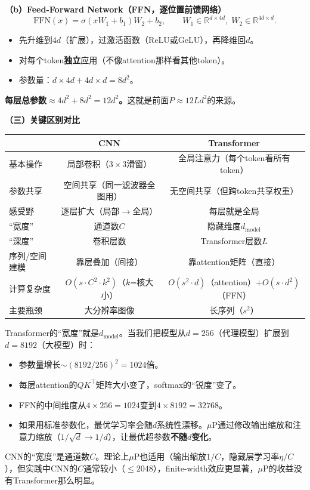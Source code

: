 \documentclass[11pt,a4paper]{article}
\newcommand{\R}{\mathbb{R}}
\begin{document}
\textbf{（b）Feed-Forward Network（FFN，逐位置前馈网络）}
\[
\text{FFN}(x) = \sigma(xW_1 + b_1)W_2 + b_2, \qquad W_1\in\R^{d\times 4d},\; W_2\in\R^{4d\times d}.
\]
\begin{itemize}[leftmargin=*]
\item 先升维到$4d$（扩展），过激活函数（ReLU或GeLU），再降维回$d$。
\item 对每个token\textbf{独立}应用（不像attention那样看其他token）。
\item 参数量：$d\times 4d + 4d\times d = 8d^2$。
\end{itemize}

\textbf{每层总参数$\approx 4d^2 + 8d^2 = 12d^2$。}这就是前面$P\approx 12Ld^2$的来源。

\bigskip
\textbf{（三）关键区别对比}

\begin{center}
\renewcommand{\arraystretch}{1.3}
\begin{tabular}{l|cc}
\toprule
& \textbf{CNN} & \textbf{Transformer} \\
\midrule
基本操作 & 局部卷积（$3\times 3$滑窗） & 全局注意力（每个token看所有token） \\
参数共享 & 空间共享（同一滤波器全图用） & 无空间共享（但跨token共享权重） \\
感受野 & 逐层扩大（局部$\to$全局） & 每层就是全局 \\
``宽度'' & 通道数$C$ & 隐藏维度$d_{\text{model}}$ \\
``深度'' & 卷积层数 & Transformer层数$L$ \\
序列/空间建模 & 靠层叠加（间接） & 靠attention矩阵（直接） \\
计算复杂度 & $O(s\cdot C^2\cdot k^2)$（$k$=核大小） & $O(s^2\cdot d)$（attention）$+ O(s\cdot d^2)$（FFN） \\
主要瓶颈 & 大分辨率图像 & 长序列（$s^2$） \\
\bottomrule
\end{tabular}
\end{center}

\begin{keyinsight}
Transformer的``宽度''就是$d_{\text{model}}$。当我们把模型从$d=256$（代理模型）扩展到$d=8192$（大模型）时：
\begin{itemize}[leftmargin=*]
\item 参数量增长$\sim(8192/256)^2=1024$倍。
\item 每层attention的$QK^\top$矩阵大小变了，softmax的``锐度''变了。
\item FFN的中间维度从$4\times 256=1024$变到$4\times 8192=32768$。
\item 如果用标准参数化，最优学习率会随$d$系统性漂移。$\mu$P通过修改输出缩放和注意力缩放（$1/\sqrt{d}\to 1/d$），让最优超参数\textbf{不随$d$变化}。
\end{itemize}

CNN的``宽度''是通道数$C$。理论上$\mu$P也适用（输出缩放$1/C$，隐藏层学习率$\eta/C$），但实践中CNN的$C$通常较小（$\le 2048$），finite-width效应更显著，$\mu$P的收益没有Transformer那么明显。
\end{keyinsight}
\end{document}
